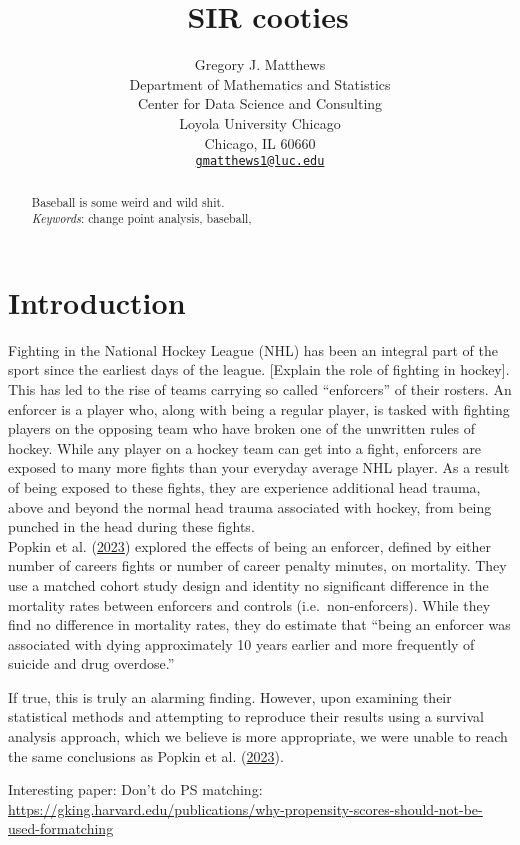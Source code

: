 \documentclass[
  12pt,
]{article}
\title{~\Large SIR cooties}
\author{\large Gregory J. Matthews \vspace{-1.1mm}\\
\normalsize Department of Mathematics and Statistics \vspace{-1mm}\\
\normalsize Center for Data Science and Consulting \vspace{-1mm}\\
\normalsize Loyola University Chicago \vspace{-1mm}\\
\normalsize Chicago, IL 60660 \vspace{-1mm}\\
\normalsize \href{mailto:gmatthews1@luc.edu}{\texttt{gmatthews1@luc.edu}}
\vspace{-1mm}}
\date{}
\begin{document}
\maketitle
\begin{abstract}
Baseball is some weird and wild shit. \vspace{2mm}\\
\emph{Keywords}: change point analysis, baseball,
\end{abstract}

\newpage

\hypertarget{sec:intro}{%
\section{Introduction}\label{sec:intro}}

Fighting in the National Hockey League (NHL) has been an integral part
of the sport since the earliest days of the league. {[}Explain the role
of fighting in hockey{]}. This has led to the rise of teams carrying so
called ``enforcers'' of their rosters. An enforcer is a player who,
along with being a regular player, is tasked with fighting players on
the opposing team who have broken one of the unwritten rules of hockey.
While any player on a hockey team can get into a fight, enforcers are
exposed to many more fights than your everyday average NHL player. As a
result of being exposed to these fights, they are experience additional
head trauma, above and beyond the normal head trauma associated with
hockey, from being punched in the head during these fights.\\
Popkin et al. (\protect\hyperlink{ref-Popkin2023}{2023}) explored the
effects of being an enforcer, defined by either number of careers fights
or number of career penalty minutes, on mortality. They use a matched
cohort study design and identity no significant difference in the
mortality rates between enforcers and controls (i.e.~non-enforcers).
While they find no difference in mortality rates, they do estimate that
``being an enforcer was associated with dying approximately 10 years
earlier and more frequently of suicide and drug overdose.''

If true, this is truly an alarming finding. However, upon examining
their statistical methods and attempting to reproduce their results
using a survival analysis approach, which we believe is more
appropriate, we were unable to reach the same conclusions as Popkin et
al. (\protect\hyperlink{ref-Popkin2023}{2023}).

Interesting paper: Don't do PS matching:
\url{https://gking.harvard.edu/publications/why-propensity-scores-should-not-be-used-formatching}
\end{document}
